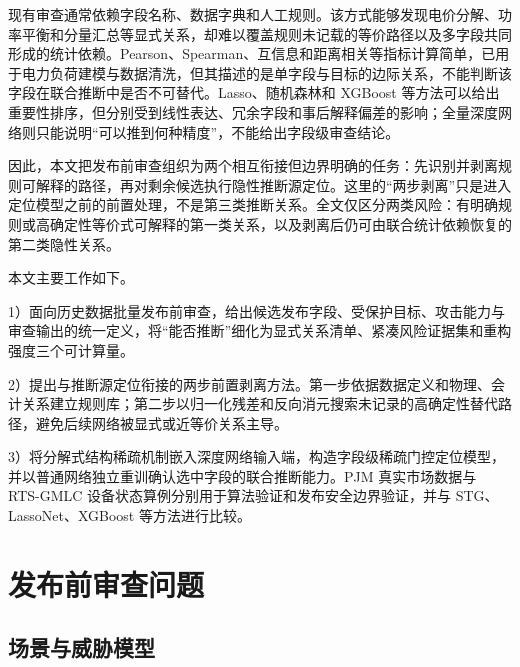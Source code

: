 \documentclass[UTF8,zihao=5,twoside,fontset=none]{ctexart}
\begin{document}
现有审查通常依赖字段名称、数据字典和人工规则。该方式能够发现电价分解、功率平衡和分量汇总等显式关系，却难以覆盖规则未记载的等价路径以及多字段共同形成的统计依赖。Pearson、Spearman、互信息和距离相关等指标计算简单，已用于电力负荷建模与数据清洗\cite{ref-lan-load,ref-jiao-pv,ref-deng-load,ref-szekely-dcorr,ref-reshef-mic}，但其描述的是单字段与目标的边际关系，不能判断该字段在联合推断中是否不可替代。Lasso、随机森林和 XGBoost 等方法可以给出重要性排序\cite{ref-tibshirani-lasso,ref-breiman-rf,ref-chen-xgboost}，但分别受到线性表达、冗余字段和事后解释偏差的影响；全量深度网络则只能说明“可以推到何种精度”，不能给出字段级审查结论。

因此，本文把发布前审查组织为两个相互衔接但边界明确的任务：先识别并剥离规则可解释的路径，再对剩余候选执行隐性推断源定位。这里的“两步剥离”只是进入定位模型之前的前置处理，不是第三类推断关系。全文仅区分两类风险：有明确规则或高确定性等价式可解释的第一类关系，以及剥离后仍可由联合统计依赖恢复的第二类隐性关系。

本文主要工作如下。

1）面向历史数据批量发布前审查，给出候选发布字段、受保护目标、攻击能力与审查输出的统一定义，将“能否推断”细化为显式关系清单、紧凑风险证据集和重构强度三个可计算量。

2）提出与推断源定位衔接的两步前置剥离方法。第一步依据数据定义和物理、会计关系建立规则库；第二步以归一化残差和反向消元搜索未记录的高确定性替代路径，避免后续网络被显式或近等价关系主导。

3）将分解式结构稀疏机制嵌入深度网络输入端，构造字段级稀疏门控定位模型，并以普通网络独立重训确认选中字段的联合推断能力。PJM 真实市场数据与 RTS-GMLC 设备状态算例分别用于算法验证和发布安全边界验证，并与 STG、LassoNet、XGBoost 等方法进行比较。

\section{发布前审查问题}

\subsection{场景与威胁模型}
\end{document}
